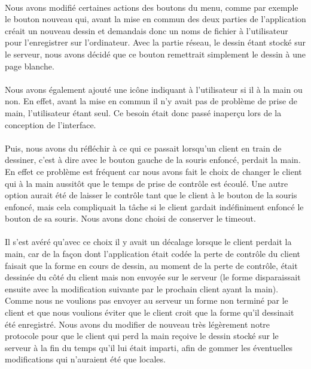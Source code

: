 \documentclass[a4paper,11pt]{article}
\begin{document}
\paragraph{} Nous avons modifié certaines actions des boutons du menu, comme par exemple le bouton nouveau qui, avant la mise en commun des deux parties de l'application créait un nouveau dessin et demandais donc un noms de fichier à l'utilisateur pour l'enregistrer sur l'ordinateur. Avec la partie réseau, le dessin étant stocké sur le serveur, nous avons décidé que ce bouton remettrait simplement le dessin à une page blanche.

\paragraph{} Nous avons également ajouté une icône indiquant à l'utilisateur si il à la main ou non. En effet, avant la mise en commun il n'y avait pas de problème de prise de main, l'utilisateur étant seul. Ce besoin était donc passé inaperçu lors de la conception de l'interface.

\paragraph{} Puis, nous avons du réfléchir à ce qui ce passait lorsqu'un client en train de dessiner, c'est à dire avec le bouton gauche de la souris enfoncé, perdait la main. En effet ce problème est fréquent car nous avons fait le choix de changer le client qui à la main aussitôt que le temps de prise de contrôle est écoulé. Une autre option aurait été de laisser le contrôle tant que le client à le bouton de la souris enfoncé, mais cela compliquait la tâche si le client gardait indéfiniment enfoncé le bouton de sa souris. Nous avons donc choisi de conserver le timeout.

\paragraph{}Il s'est avéré qu'avec ce choix il y avait un décalage lorsque le client perdait la main, car de la façon dont l'application était codée la perte de contrôle du client faisait que la forme en cours de dessin, au moment de la perte de contrôle, était dessinée du côté du client mais non envoyée sur le serveur (le forme disparaissait ensuite avec la modification suivante par le prochain client ayant la main). Comme nous ne voulions pas envoyer au serveur un forme non terminé par le client et que nous voulions éviter que le client croit que la forme qu'il dessinait été enregistré. Nous avons du modifier de nouveau très légèrement notre protocole pour que le client qui perd la main reçoive le dessin stocké sur le serveur à la fin du temps qu'il lui était imparti, afin de gommer les éventuelles modifications qui n'auraient été que locales.
\end{document}
